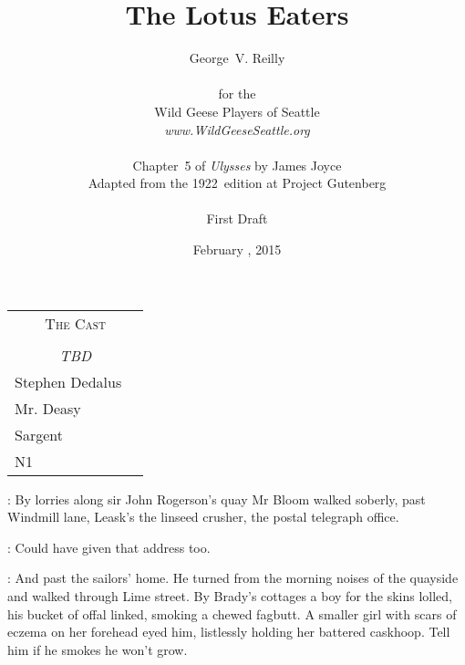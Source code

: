 



\title{\Huge The Lotus Eaters}
\author{George~V. Reilly\\
\\
{\small for the}\\
Wild Geese Players of Seattle\\
{\emph{www.WildGeeseSeattle.org}}\\
\\
{\small Chapter~5 of \emph{Ulysses} by James Joyce}\\
{\small Adapted from the 1922~edition at Project Gutenberg}
\\
\\
{\small First Draft}}
\date{February , 2015}
\raggedbottom



\maketitle
\thispagestyle{empty}
\pagebreak

\begin{tabular}{lp{10cm}}
    \multicolumn{2}{c}{\Large \textsc{The Cast}} \\
\\
    \multicolumn{2}{c}{\large \textit{TBD}} \\
Stephen Dedalus \\
Mr. Deasy \\
Sargent \\
N1 \\
\end{tabular}

\thispagestyle{empty}
\newpage


\setcounter{page}{1}

:
By lorries along sir John Rogerson's quay
Mr Bloom walked soberly,
past Windmill lane,
Leask's the linseed crusher,
the postal telegraph office.

\BloomInt:
Could have given that address too.

:
And past the sailors' home.
He turned from the morning noises of the quayside
and walked through Lime street.
By Brady's cottages
a boy for the skins lolled,
his bucket of offal linked,
smoking a chewed fagbutt.
A smaller girl with scars of eczema on her forehead
eyed him,
listlessly holding her battered caskhoop.
Tell him if he smokes he won't grow.

